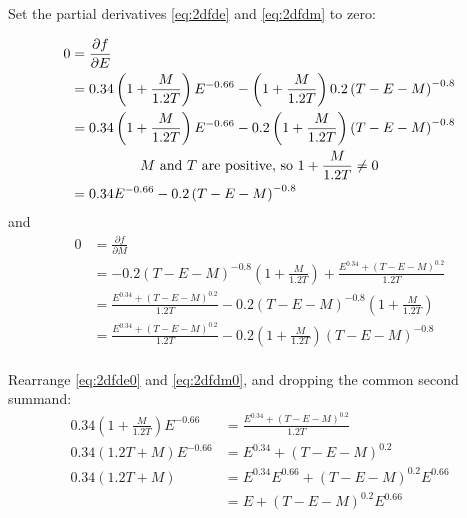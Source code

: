 \documentclass{article}
\begin{document}
Set the partial derivatives \eqref{eq:2dfde} and \eqref{eq:2dfdm} to zero:

\begin{equation}\label{eq:2dfde0}
  \begin{split}
    0 & = \frac{\partial f}{\partial E} \\
    & = 0.34\left( 1 + \frac{M}{1.2 T} \right)E^{-0.66} - \left( 1 + \frac{M}{1.2 T} \right)0.2\left( T - E - M \right)^{-0.8} \\
    & = 0.34\left( 1 + \frac{M}{1.2 T} \right)E^{-0.66} - 0.2\left( 1 + \frac{M}{1.2 T} \right)\left( T - E - M \right)^{-0.8} \\
    \span \text{$M$ and $T$ are positive, so $1 + \frac{M}{1.2T} \ne 0$} \\
    & = 0.34E^{-0.66} - 0.2\left( T - E - M \right)^{-0.8} \\
  \end{split}
\end{equation}
and
\begin{equation}\label{eq:2dfdm0}
  \begin{split}
    0 & = \frac{\partial f}{\partial M} \\
    & = - 0.2\left( T - E - M \right)^{-0.8}\left( 1 + \frac{M}{1.2 T} \right) + \frac{E^{0.34} + \left( T - E - M \right)^{0.2}}{1.2 T} \\
    & = \frac{E^{0.34} + \left( T - E - M \right)^{0.2}}{1.2 T} - 0.2\left( T - E - M \right)^{-0.8}\left( 1 + \frac{M}{1.2 T} \right) \\
    & = \frac{E^{0.34} + \left( T - E - M \right)^{0.2}}{1.2 T} - 0.2\left( 1 + \frac{M}{1.2 T} \right)\left( T - E - M \right)^{-0.8} \\
  \end{split}
\end{equation}

Rearrange \eqref{eq:2dfde0} and \eqref{eq:2dfdm0}, and dropping the common second summand:
\begin{equation}\label{eq:2dfde0r}
  \begin{split}
    0.34\left( 1 + \frac{M}{1.2 T} \right)E^{-0.66} & = \frac{E^{0.34} + \left( T - E - M \right)^{0.2}}{1.2 T} \\
    0.34\left(1.2T + M\right)E^{-0.66} & = E^{0.34} + \left( T - E - M \right)^{0.2} \\
    0.34\left(1.2T + M\right) & = E^{0.34}E^{0.66} + \left( T - E - M \right)^{0.2}E^{0.66} \\
    & = E + \left( T - E - M \right)^{0.2}E^{0.66} \\
  \end{split}
\end{equation}
\end{document}
